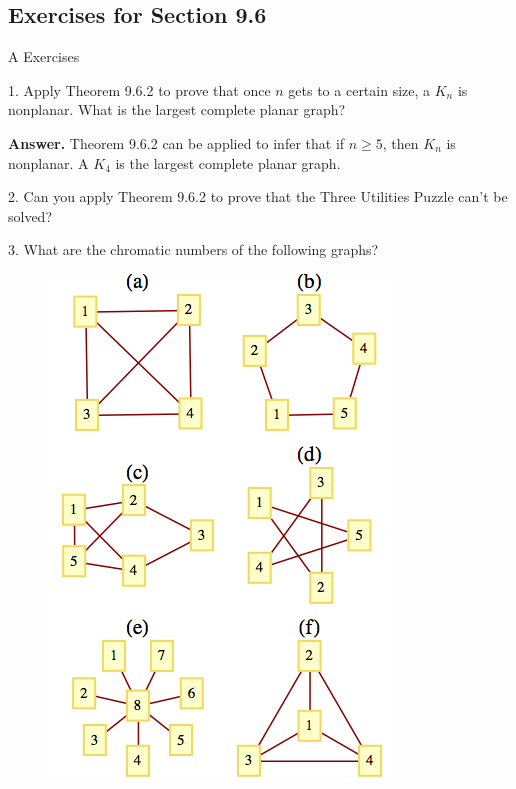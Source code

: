\documentclass[10pt,]{book}
\theoremstyle{plain}
\theoremstyle{definition}
\theoremstyle{definition}
\theoremstyle{definition}
\theoremstyle{definition}
\theoremstyle{definition}
\numberwithin{equation}{section}
\begin{document}
\subsection[Exercises for Section 9.6]{Exercises for Section 9.6}\label{exercises-9-6}
\hypertarget{exercisegroup-10}{}\typeout{************************************************}
\typeout{************************************************}
A Exercises%
\begin{exercisegroup}
\item[1.]\hypertarget{exercise-42}{} Apply Theorem 9.6.2 to prove that once \(n\) gets to a certain size, a \(K_n\) is nonplanar. What is the largest complete planar graph?%
\par\smallskip
\par\smallskip
\noindent\textbf{Answer.}\hypertarget{answer-16}{}\quad
Theorem 9.6.2 can be applied to infer that if \(n\geqslant 5\), then \(K_n\) is nonplanar. A \(K_4\) is the largest complete planar graph.
%
\item[2.]\hypertarget{exercise-43}{} Can you apply Theorem 9.6.2 to prove that the Three Utilities Puzzle can't be solved?%
\par\smallskip
\item[3.]\hypertarget{exercise-44}{} What are the chromatic numbers of the following graphs?%
\leavevmode%
\begin{figure}
\centering
\includegraphics[width=1\linewidth]{images/fig-exercise-9-6-3.png}

\end{figure}
\end{exercisegroup}
\end{document}
